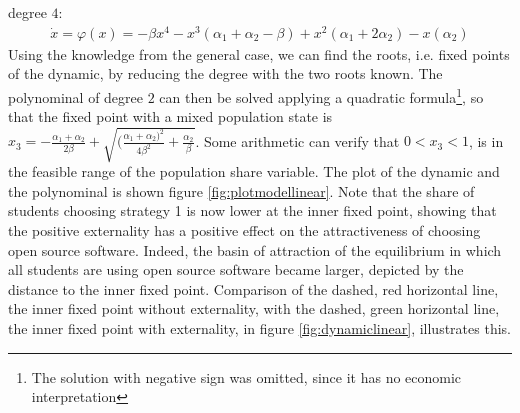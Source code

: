 \documentclass[11pt]{article}
\begin{document}
degree $4$:
\begin{align}
        \dot{x} = \varphi(x) = -\beta x^4 -x^3(\alpha_1 + \alpha_2 
        - \beta ) + x^2 (\alpha_1 + 2 \alpha_2) - x(\alpha_2)
\end{align}
Using the knowledge from the general case, we can find the roots, i.e. fixed
points of the dynamic, by reducing the degree with the two roots known. The
polynominal of degree $2$ can then be solved applying a quadratic formula\footnote{
The solution with negative sign was omitted, since it has no economic 
interpretation}, so that the fixed point with a mixed population state is
$x_3 = -\frac{\alpha_1+\alpha_2}{2 \beta} + 
\sqrt{(\frac{\alpha_1+\alpha_2)^2}{4\beta^2} +\frac{\alpha_2}{\beta}}$. 
Some arithmetic can verify that $0<x_3<1$, is in the feasible range of the
population share variable. The plot of the dynamic and the polynominal is 
shown figure \ref{fig:plotmodellinear}.
Note that the share of students choosing strategy 1 is now lower at the 
inner fixed point, showing that the positive externality has a positive 
effect on the attractiveness of choosing open source software. Indeed,
the basin of attraction of the equilibrium in which all students are using 
open source software became larger, depicted by the distance to the
inner fixed point.
Comparison of the dashed, red horizontal line, the inner fixed point without 
externality, with the dashed, green horizontal line, the inner fixed point 
with externality, in figure \ref{fig:dynamiclinear}, illustrates this. 
\end{document}

